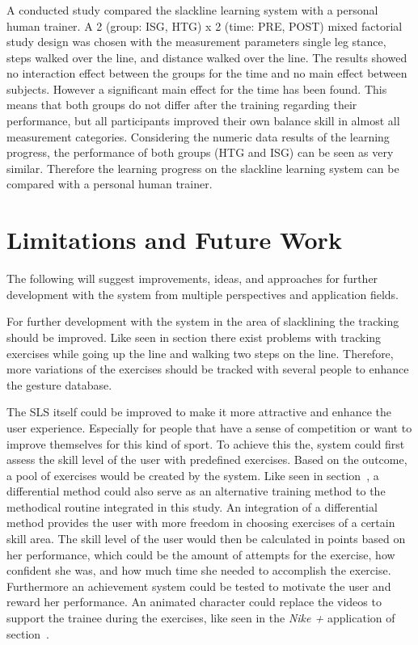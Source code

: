 \subsubsection{}
A conducted study compared the slackline learning system with a personal human trainer.
A 2 (group: ISG, HTG) x 2 (time: PRE, POST) mixed factorial study design was chosen with the measurement parameters single leg stance, steps walked over the line, and distance walked over the line.
The results showed no interaction effect between the groups for the time and no main effect between subjects.
However a significant main effect for the time has been found.
This means that both groups do not differ after the training regarding their performance, but all participants improved their own balance skill in almost all measurement categories.
Considering the numeric data results of the learning progress, the performance of both groups (HTG and ISG) can be seen as very similar.
Therefore the learning progress on the slackline learning system can be compared with a personal human trainer.

\section{Limitations and Future Work}
The following will suggest improvements, ideas, and approaches for further development with the system from multiple perspectives and application fields.

For further development with the system in the area of slacklining the tracking should be improved.
Like seen in section \textit{} there exist problems with tracking exercises while going up the line and walking two steps on the line.
Therefore, more variations of the exercises should be tracked with several people to enhance the gesture database.

The SLS itself could be improved to make it more attractive and enhance the user experience.
Especially for people that have a sense of competition or want to improve themselves for this kind of sport. 
To achieve this the, system could first assess the skill level of the user with predefined exercises.
Based on the outcome, a pool of exercises would be created by the system.
Like seen in section~\textit{}, a differential method could also serve as an alternative training method to the methodical routine integrated in this study.
An integration of a differential method provides the user with more freedom in choosing exercises of a certain skill area.
The skill level of the user would then be calculated in points based on her performance, which could be the amount of attempts for the exercise, how confident she was, and how much time she needed to accomplish the exercise.
Furthermore an achievement system could be tested to motivate the user and reward her performance.
An animated character could replace the videos to support the trainee during the exercises, like seen in the \textit{Nike +} application of section~\textit{}.

